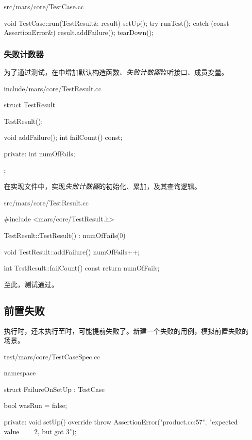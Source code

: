 \begin{content}
\begin{nodiff}{src/mars/core/TestCase.cc}
\begin{c++}
void TestCase::run(TestResult& result) {
  setUp();
  try {
    runTest();
  } catch (const AssertionError&) {
    result.addFailure();
  }
  tearDown();
}
 \end{c++}
\end{nodiff}

\subsubsection{失败计数器}

为了通过测试，在中增加默认构造函数、\emph{失败计数器}监听接口、成员变量。

\begin{nodiff}{include/mars/core/TestResult.cc}
 \begin{c++}
struct TestResult {
  TestResult();

  void addFailure();
  int failCount() const;

private:
  int numOfFails;
};
 \end{c++}
\end{nodiff}

在实现文件中，实现\emph{失败计数器}的初始化、累加，及其查询逻辑。

\begin{nodiff}{src/mars/core/TestResult.cc}
 \begin{c++}
#include <mars/core/TestResult.h>

TestResult::TestResult() : numOfFails(0) {
}

void TestResult::addFailure() {
  numOfFails++;
}

int TestResult::failCount() const {
  return numOfFails;
}
 \end{c++}
\end{nodiff}

至此，测试通过。

\subsection{前置失败}

执行时，还未执行至时，可能提前失败了。新建一个失败的用例，模拟前置失败的场景。

\begin{nodiff}{test/mars/core/TestCaseSpec.cc}
 \begin{c++}
namespace {
  struct FailureOnSetUp : TestCase {
    bool wasRun = false;

  private:
    void setUp() override {
      throw AssertionError("product.cc:57", "expected value == 2, but got 3");
    }

}}
\end{c++}
\end{nodiff}
\end{content}
